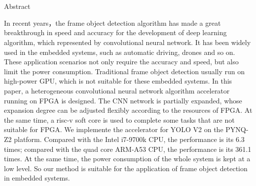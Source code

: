 \chapter[Abstract]{\MyTitleEn}

\begin{center}
\vspace{-0.3cm}
 \songti Abstract
\vspace{0.3cm}
\end{center}

In recent years，the frame object detection algorithm has made a great breakthrough in speed and accuracy for the development of deep learning algorithm, which represented by convolutional neural network. It has been widely used in the embedded systems, such as automatic driving, drones and so on. These application scenarios not only require the accuracy and speed, but also limit the power consumption. Traditional frame object detection usually run on high-power GPU, which is not suitable for these embedded systems. In this paper, a heterogeneous convolutional neural network algorithm accelerator running on FPGA is designed. The CNN network is partially expanded, whose expansion degree can be adjusted flexibly according to the resources of FPGA. At the same time, a risc-v soft core is used to complete some tasks that are not suitable for FPGA. We implemente the accelerator for YOLO V2 on the PYNQ-Z2 platform. Compared with the Intel i7-9700k CPU, the performance is its 6.3 times; compared with the quad core ARM-A53 CPU, the performance is its 361.1 times. At the same time, the power consumption of the whole system is kept at a low level. So our method is suitable for the application of frame object detection in embedded systems.


